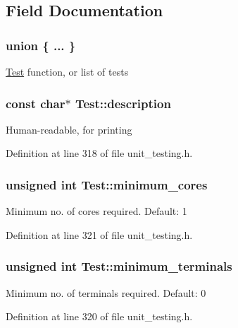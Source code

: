 \subsection{Field Documentation}
\hypertarget{structTest_a6dd50dae1a4469e7723e85331dbf9ba0}{\subsubsection[{"@3}]{\setlength{\rightskip}{0pt plus 5cm}union \{ ... \} }}\label{structTest_a6dd50dae1a4469e7723e85331dbf9ba0}
\hyperlink{structTest}{Test} function, or list of tests \hypertarget{structTest_a294ca3f1114240c908f66216afcad783}{
\subsubsection[{description}]{\setlength{\rightskip}{0pt plus 5cm}const char$\ast$ Test\-::description}}\label{structTest_a294ca3f1114240c908f66216afcad783}
Human-\/readable, for printing 

Definition at line 318 of file unit\-\_\-testing.\-h.

\hypertarget{structTest_ac203918837b4c6718a020246e189a95a}{
\subsubsection[{minimum\-\_\-cores}]{\setlength{\rightskip}{0pt plus 5cm}unsigned int Test\-::minimum\-\_\-cores}}\label{structTest_ac203918837b4c6718a020246e189a95a}
Minimum no. of cores required. Default\-: 1 

Definition at line 321 of file unit\-\_\-testing.\-h.

\hypertarget{structTest_a2741188633c51b8e3cb545fa3971bf60}{
\subsubsection[{minimum\-\_\-terminals}]{\setlength{\rightskip}{0pt plus 5cm}unsigned int Test\-::minimum\-\_\-terminals}}\label{structTest_a2741188633c51b8e3cb545fa3971bf60}
Minimum no. of terminals required. Default\-: 0 

Definition at line 320 of file unit\-\_\-testing.\-h.

